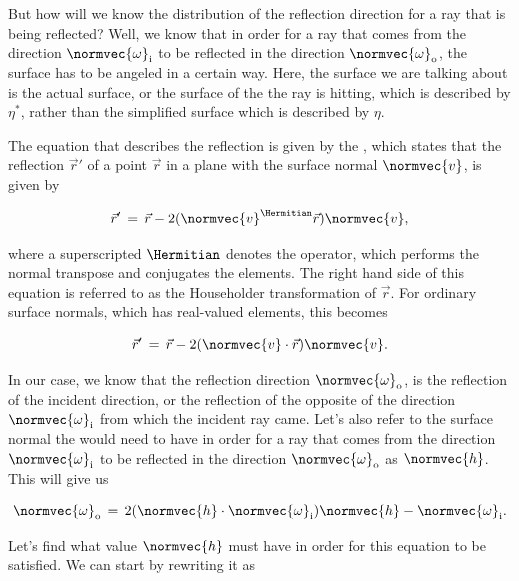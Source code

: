 But how will we know the distribution of the reflection direction for a ray that is being reflected? Well, we know that in order for a ray that comes from the direction $\normvec{\omega}_{\text{i}}$ to be reflected in the direction $\normvec{\omega}_{\text{o}}$, the surface has to be angeled in a certain way. Here, the surface we are talking about is the actual surface, or the surface of the \microfacet the ray is hitting, which is described by $\eta^*$, rather than the simplified surface which is described by $\eta$.

The equation that describes the reflection is given by the , which states that the reflection $\vec{r}'$ of a point $\vec{r}$ in a plane with the surface normal $\normvec{v}$, is given by

\begin{equation}
\vec{r}' \,=\, \vec{r} - 2(\normvec{v}^{\Hermitian}\vec{r})\normvec{v},
\end{equation}

where a superscripted $\Hermitian$ denotes the  operator, which performs the normal transpose and conjugates the elements. The right hand side of this equation is referred to as the Householder transformation of $\vec{r}$. For ordinary surface normals, which has real-valued elements, this becomes

\begin{equation}
\vec{r}' \,=\, \vec{r} - 2(\normvec{v}\cdot\vec{r})\normvec{v}.
\end{equation}

In our case, we know that the reflection direction $\normvec{\omega}_{\text{o}}$, is the reflection of the incident direction, or the reflection of the opposite of the direction $\normvec{\omega}_{\text{i}}$ from which the incident ray came. Let's also refer to the surface normal the \microfacet would need to have in order for a ray that comes from the direction $\normvec{\omega}_{\text{i}}$ to be reflected in the direction $\normvec{\omega}_{\text{o}}$ as $\normvec{h}$. This will give us

\begin{equation} \label{eq:householder_equation}
\normvec{\omega}_{\text{o}} \,=\, 2(\normvec{h}\cdot\normvec{\omega}_{\text{i}})\normvec{h} - \normvec{\omega}_{\text{i}}.
\end{equation}

Let's find what value $\normvec{h}$ must have in order for this equation to be satisfied. We can start by rewriting it as

